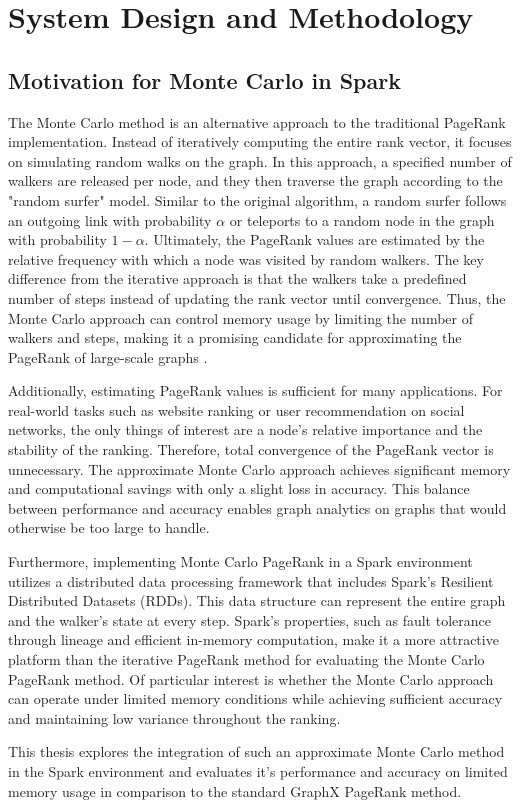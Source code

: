 \section{System Design and Methodology}
\subsection{Motivation for Monte Carlo in Spark}
The Monte Carlo method is an alternative approach to the traditional PageRank implementation. Instead of iteratively computing the entire rank vector, it focuses on simulating random walks on the graph. In this approach, a specified number of walkers are released per node, and they then traverse the graph according to the "random surfer" model. Similar to the original algorithm, a random surfer follows an outgoing link with probability $\alpha$ or teleports to a random node in the graph with probability $1-\alpha$. Ultimately, the PageRank values are estimated by the relative frequency with which a node was visited by random walkers. The key difference from the iterative approach is that the walkers take a predefined number of steps instead of updating the rank vector until convergence. Thus, the Monte Carlo approach can control memory usage by limiting the number of walkers and steps, making it a promising candidate for approximating the PageRank of large-scale graphs \cite{avrachenkov_monte_2007}. \par
Additionally, estimating PageRank values is sufficient for many applications. For real-world tasks such as website ranking or user recommendation on social networks, the only things of interest are a node's relative importance and the stability of the ranking. Therefore, total convergence of the PageRank vector is unnecessary. The approximate Monte Carlo approach achieves significant memory and computational savings with only a slight loss in accuracy. This balance between performance and accuracy enables graph analytics on graphs that would otherwise be too large to handle.\par
Furthermore, implementing Monte Carlo PageRank in a Spark environment utilizes a distributed data processing framework that includes Spark's Resilient Distributed \allowbreak Datasets (RDDs). This data structure can represent the entire graph and the walker's state at every step. Spark's properties, such as fault tolerance through lineage and efficient in-memory computation, make it a more attractive platform than the iterative PageRank method for evaluating the Monte Carlo PageRank method. Of particular interest is whether the Monte Carlo approach can operate under limited memory conditions while achieving sufficient accuracy and maintaining low variance throughout the ranking. \par
This thesis explores the integration of such an approximate Monte Carlo method in the Spark environment and evaluates it's performance and accuracy on limited memory usage in comparison to the standard GraphX PageRank method.
 

